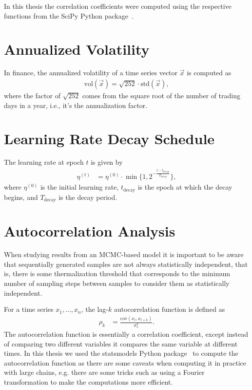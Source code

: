 In this thesis the correlation coefficients were computed using the respective functions from the SciPy Python package~\cite{python_scipy}.

\section{Annualized Volatility}\label{app:annualized_volatility}
In finance, the annualized volatility of a time series vector \( \vec{x} \) is computed as
\begin{align}
    \text{vol}(\vec{x}) = \sqrt{252} \cdot \text{std}(\vec{x}),
\end{align}
where the factor of \( \sqrt{252} \) comes from the square root of the number of trading days in a year, i.e., it's the annualization factor.

\section{Learning Rate Decay Schedule}\label{app:lr_exp_decay}
The learning rate at epoch \( t \) is given by
\begin{align}
    \eta^{(t)}
        &= \eta^{(0)} \cdot \min\bigg\{1, 2^{-\frac{t - t_\text{decay}}{T_\text{decay}}}\bigg\},
\end{align}
where \( \eta^{(0)} \) is the initial learning rate, \( t_\text{decay} \) is the epoch at which the decay begins, and \( T_\text{decay} \) is the decay period.

\section{Autocorrelation Analysis}\label{app:autocorrelation_analysis}
When studying results from an MCMC-based model it is important to be aware that sequentially generated samples are not always statistically independent, that is, there is some thermalization threshold that corresponds to the minimum number of sampling steps between samples to consider them as statistically independent.

For a time series \( x_1, \dots, x_n \), the lag-\( k \) autocorrelation function is defined as~\cite{time_series_analysis}
\begin{align}
    \rho_k
        &= \frac{\text{cov}(x_t, x_{t+k})}{\sigma_{x}^2}.
\end{align}
The autocorrelation function is essentially a correlation coefficient, except instead of comparing two different variables it compares the same variable at different times.
In this thesis we used the statsmodels Python package~\cite{python_statsmodels} to compute the autocorrelation function as there are some caveats when computing it in practice with large chains, e.g. there are some tricks such as using a Fourier transformation to make the computations more efficient.

